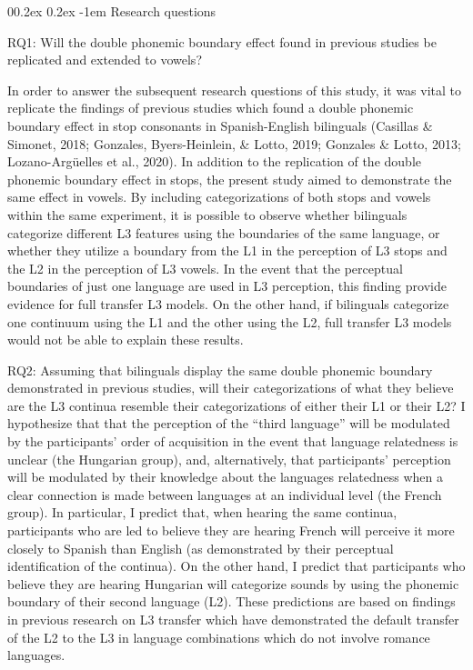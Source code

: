 \documentclass[
  english,
  man]{apa6}
\makeatletter
\let\oldparagraph\paragraph
\renewcommand{\paragraph}[1]{\oldparagraph{#1}\mbox{}}
\renewcommand{\paragraph}{\@startsection{paragraph}{4}{\parindent}%
  {0\baselineskip \@plus 0.2ex \@minus 0.2ex}%
  {-1em}%
  {\normalfont\normalsize\bfseries\itshape\typesectitle}}
\makeatother
\begin{document}
\hypertarget{research-questions}{%
\paragraph{Research questions}\label{research-questions}}

RQ1: Will the double phonemic boundary effect found in previous studies be replicated and extended to vowels?

In order to answer the subsequent research questions of this study, it was vital to replicate the findings of previous studies which found a double phonemic boundary effect in stop consonants in Spanish-English bilinguals (Casillas \& Simonet, 2018; Gonzales, Byers-Heinlein, \& Lotto, 2019; Gonzales \& Lotto, 2013; Lozano-Argüelles et al., 2020). In addition to the replication of the double phonemic boundary effect in stops, the present study aimed to demonstrate the same effect in vowels. By including categorizations of both stops and vowels within the same experiment, it is possible to observe whether bilinguals categorize different L3 features using the boundaries of the same language, or whether they utilize a boundary from the L1 in the perception of L3 stops and the L2 in the perception of L3 vowels. In the event that the perceptual boundaries of just one language are used in L3 perception, this finding provide evidence for full transfer L3 models. On the other hand, if bilinguals categorize one continuum using the L1 and the other using the L2, full transfer L3 models would not be able to explain these results.

RQ2: Assuming that bilinguals display the same double phonemic boundary demonstrated in previous studies, will their categorizations of what they believe are the L3 continua resemble their categorizations of either their L1 or their L2?
I hypothesize that that the perception of the ``third language'' will be modulated by the participants' order of acquisition in the event that language relatedness is unclear (the Hungarian group), and, alternatively, that participants' perception will be modulated by their knowledge about the languages relatedness when a clear connection is made between languages at an individual level (the French group).
In particular, I predict that, when hearing the same continua, participants who are led to believe they are hearing French will perceive it more closely to Spanish than English (as demonstrated by their perceptual identification of the continua).
On the other hand, I predict that participants who believe they are hearing Hungarian will categorize sounds by using the phonemic boundary of their second language (L2).
These predictions are based on findings in previous research on L3 transfer which have demonstrated the default transfer of the L2 to the L3 in language combinations which do not involve romance languages.
\end{document}
